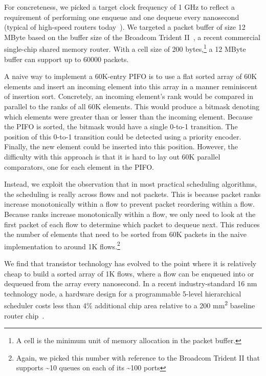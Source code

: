 For concreteness, we picked a target clock frequency of 1 GHz to reflect a
requirement of performing one enqueue and one dequeue every nanosecond (typical
of high-speed routers today~\cite{rmt}). We targeted a packet buffer of size 12
MByte based on the buffer size of the Broadcom Trident
II~\cite{bcom_buffer}, a recent commercial single-chip shared memory
router. With a cell size of 200 bytes,\footnote{A cell is the minimum unit of
memory allocation in the packet buffer.} a 12 MByte buffer can support up to
60000 packets.

A naive way to implement a 60K-entry PIFO is to use a flat sorted array of 60K
elements and insert an incoming element into this array in a manner reminiscent
of insertion sort. Concretely, an incoming element's rank would be compared in
parallel to the ranks of all 60K elements. This would produce a bitmask
denoting which elements were greater than or lesser than the incoming element.
Because the PIFO is sorted, the bitmask would have a single 0-to-1 transition.
The position of this 0-to-1 transition could be detected using a priority
encoder. Finally, the new element could be inserted into this position.
However, the difficulty with this approach is that it is hard to lay out 60K
parallel comparators, one for each element in the PIFO.

Instead, we exploit the observation that in most practical scheduling
algorithms, the scheduling is really across flows and not packets. This is
because packet ranks increase monotonically within a flow to prevent packet
reordering within a flow. Because ranks increase monotonically within a flow,
we only need to look at the first packet of each flow to determine which packet
to dequeue next. This reduces the number of elements that need to be sorted
from 60K packets in the naive implementation to around 1K
flows.\footnote{Again, we picked this number with reference to the Broadcom
Trident II that supports \textasciitilde10 queues on each of its
\textasciitilde100 ports}

We find that transistor technology has evolved to the point where it is
relatively cheap to build a sorted array of 1K flows, where a flow can be
enqueued into or dequeued from the array every nanosecond. In a recent
industry-standard 16 nm technology node, a hardware design for a programmable
5-level hierarchical scheduler costs less than 4\% additional chip area
relative to a 200 \si{\milli\meter\squared} baseline router
chip~\cite{glen_parsing}.

